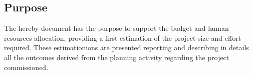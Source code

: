 \subsection{Purpose}

The hereby document has the purpose to support the budget and human resources allocation, providing a first estimation of the project size and effort required. These estimationions are presented reporting and describing in details all the outcomes derived from the planning activity regarding the project commissioned.

